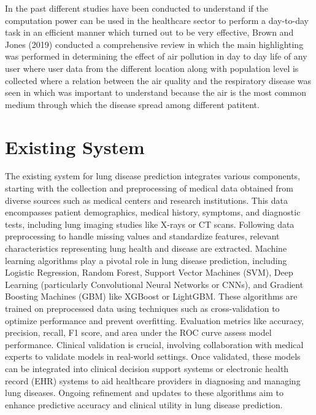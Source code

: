 \textbf{}

In the past different studies have been conducted to understand if the computation power can be used in the healthcare sector to perform a day-to-day task in an efficient manner which turned out to be very effective, Brown and Jones (2019) conducted a comprehensive review in which the main highlighting was performed in determining the effect of air pollution in day to day life of any user where user data from the different location along with population level is collected where a relation between the air quality and the respiratory disease was seen in which was important to understand because the air is the most common medium through which the disease spread among different patitent\cite{sacks2011particulate}. 


\section{Existing System} 
The existing system for lung disease prediction integrates various components, starting with the collection and preprocessing of medical data obtained from diverse sources such as medical centers and research institutions. This data encompasses patient demographics, medical history, symptoms, and diagnostic tests, including lung imaging studies like X-rays or CT scans. Following data preprocessing to handle missing values and standardize features, relevant characteristics representing lung health and disease are extracted. Machine learning algorithms play a pivotal role in lung disease prediction, including Logistic Regression, Random Forest, Support Vector Machines (SVM), Deep Learning (particularly Convolutional Neural Networks or CNNs), and Gradient Boosting Machines (GBM) like XGBoost or LightGBM. These algorithms are trained on preprocessed data using techniques such as cross-validation to optimize performance and prevent overfitting. Evaluation metrics like accuracy, precision, recall, F1 score, and area under the ROC curve assess model performance. Clinical validation is crucial, involving collaboration with medical experts to validate models in real-world settings. Once validated, these models can be integrated into clinical decision support systems or electronic health record (EHR) systems to aid healthcare providers in diagnosing and managing lung diseases. Ongoing refinement and updates to these algorithms aim to enhance predictive accuracy and clinical utility in lung disease prediction.

